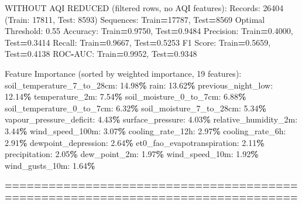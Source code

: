 \documentclass[
  letterpaper,
  DIV=11,
  numbers=noendperiod]{scrartcl}
\newenvironment{Shaded}{\begin{snugshade}}{\end{snugshade}}
\newcommand{\BuiltInTok}[1]{#1}
\newcommand{\DecValTok}[1]{\textcolor[rgb]{0.00,0.00,0.81}{#1}}
\newcommand{\FloatTok}[1]{\textcolor[rgb]{0.00,0.00,0.81}{#1}}
\newcommand{\NormalTok}[1]{#1}
\newcommand{\OperatorTok}[1]{\textcolor[rgb]{0.81,0.36,0.00}{\textbf{#1}}}
\begin{document}
\begin{Shaded}
\begin{Highlighting}[]
\NormalTok{WITHOUT AQI REDUCED (filtered rows, no AQI features):}
\NormalTok{  Records: }\DecValTok{26404}\NormalTok{ (Train: }\DecValTok{17811}\NormalTok{, Test: }\DecValTok{8593}\NormalTok{)}
\NormalTok{  Sequences: Train}\OperatorTok{=}\DecValTok{17787}\NormalTok{, Test}\OperatorTok{=}\DecValTok{8569}
\NormalTok{  Optimal Threshold: }\FloatTok{0.55}
\NormalTok{  Accuracy: Train}\OperatorTok{=}\FloatTok{0.9750}\NormalTok{, Test}\OperatorTok{=}\FloatTok{0.9484}
\NormalTok{  Precision: Train}\OperatorTok{=}\FloatTok{0.4000}\NormalTok{, Test}\OperatorTok{=}\FloatTok{0.3414}
\NormalTok{  Recall: Train}\OperatorTok{=}\FloatTok{0.9667}\NormalTok{, Test}\OperatorTok{=}\FloatTok{0.5253}
\NormalTok{  F1 Score: Train}\OperatorTok{=}\FloatTok{0.5659}\NormalTok{, Test}\OperatorTok{=}\FloatTok{0.4138}
\NormalTok{  ROC}\OperatorTok{{-}}\NormalTok{AUC: Train}\OperatorTok{=}\FloatTok{0.9952}\NormalTok{, Test}\OperatorTok{=}\FloatTok{0.9348}

\NormalTok{  Feature Importance (}\BuiltInTok{sorted}\NormalTok{ by weighted importance, }\DecValTok{19}\NormalTok{ features):}
\NormalTok{    soil\_temperature\_7\_to\_28cm: }\FloatTok{14.98}\OperatorTok{\%}
\NormalTok{    rain: }\FloatTok{13.62}\OperatorTok{\%}
\NormalTok{    previous\_night\_low: }\FloatTok{12.14}\OperatorTok{\%}
\NormalTok{    temperature\_2m: }\FloatTok{7.54}\OperatorTok{\%}
\NormalTok{    soil\_moisture\_0\_to\_7cm: }\FloatTok{6.88}\OperatorTok{\%}
\NormalTok{    soil\_temperature\_0\_to\_7cm: }\FloatTok{6.32}\OperatorTok{\%}
\NormalTok{    soil\_moisture\_7\_to\_28cm: }\FloatTok{5.34}\OperatorTok{\%}
\NormalTok{    vapour\_pressure\_deficit: }\FloatTok{4.43}\OperatorTok{\%}
\NormalTok{    surface\_pressure: }\FloatTok{4.03}\OperatorTok{\%}
\NormalTok{    relative\_humidity\_2m: }\FloatTok{3.44}\OperatorTok{\%}
\NormalTok{    wind\_speed\_100m: }\FloatTok{3.07}\OperatorTok{\%}
\NormalTok{    cooling\_rate\_12h: }\FloatTok{2.97}\OperatorTok{\%}
\NormalTok{    cooling\_rate\_6h: }\FloatTok{2.91}\OperatorTok{\%}
\NormalTok{    dewpoint\_depression: }\FloatTok{2.64}\OperatorTok{\%}
\NormalTok{    et0\_fao\_evapotranspiration: }\FloatTok{2.11}\OperatorTok{\%}
\NormalTok{    precipitation: }\FloatTok{2.05}\OperatorTok{\%}
\NormalTok{    dew\_point\_2m: }\FloatTok{1.97}\OperatorTok{\%}
\NormalTok{    wind\_speed\_10m: }\FloatTok{1.92}\OperatorTok{\%}
\NormalTok{    wind\_gusts\_10m: }\FloatTok{1.64}\OperatorTok{\%}

\OperatorTok{================================================================================}


\end{Highlighting}
\end{Shaded}
\end{document}
